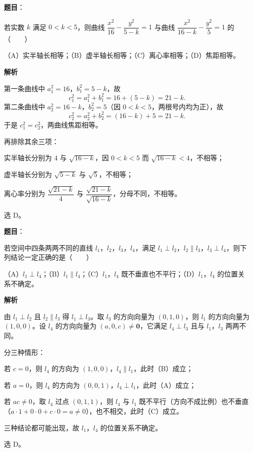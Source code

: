 \begin{answer}

\textbf{题目}：

若实数 $k$ 满足 $0<k<5$，则曲线 $\dfrac{x^2}{16}-\dfrac{y^2}{5-k}=1$ 与曲线 $\dfrac{x^2}{16-k}-\dfrac{y^2}{5}=1$ 的\mbox{（　　）}

（A）实半轴长相等；（B）虚半轴长相等；（C）离心率相等；（D）焦距相等。

\textbf{解析}

第一条曲线中 $a_1^2=16$，$b_1^2=5-k$，故
\nopagebreak[4]
\[c_1^2=a_1^2+b_1^2=16+(5-k)=21-k .\]
第二条曲线中 $a_2^2=16-k$，$b_2^2=5$（因 $0<k<5$，两根号内均为正），故
\nopagebreak[4]
\[c_2^2=a_2^2+b_2^2=(16-k)+5=21-k .\]
于是 $c_1^2=c_2^2$，两曲线焦距相等。

再排除其余三项：

实半轴长分别为 $4$ 与 $\sqrt{16-k}$，因 $0<k<5$ 而 $\sqrt{16-k}<4$，不相等；

虚半轴长分别为 $\sqrt{5-k}$ 与 $\sqrt5$，不相等；

离心率分别为 $\dfrac{\sqrt{21-k}}{4}$ 与 $\dfrac{\sqrt{21-k}}{\sqrt{16-k}}$，分母不同，不相等。

选 D。


\end{answer}
\begin{answer}

\textbf{题目}：

若空间中四条两两不同的直线 $l_1$，$l_2$，$l_3$，$l_4$，满足 $l_1\perp l_2$，$l_2\parallel l_3$，$l_3\perp l_4$，则下列结论一定正确的是\mbox{（　　）}

（A）$l_1\perp l_4$；（B）$l_1\parallel l_4$；（C）$l_1$，$l_4$ 既不垂直也不平行；（D）$l_1$，$l_4$ 的位置关系不确定。

\textbf{解析}

由 $l_1\perp l_2$ 且 $l_2\parallel l_3$ 得 $l_1\perp l_3$。取 $l_3$ 的方向向量为 $(0,1,0)$，则 $l_1$ 的方向向量为 $(1,0,0)$。设 $l_4$ 的方向向量为 $(a,0,c)\neq\boldsymbol 0$，它满足 $l_4\perp l_3$ 且与 $l_1$，$l_3$ 两两不同。

分三种情形：

若 $c=0$，则 $l_4$ 的方向为 $(1,0,0)$，$l_4\parallel l_1$，此时（B）成立；

若 $a=0$，则 $l_4$ 的方向为 $(0,0,1)$，$l_4\perp l_1$，此时（A）成立；

若 $ac\neq0$，取 $l_4$ 过点 $(0,1,1)$，则 $l_4$ 与 $l_1$ 既不平行（方向不成比例）也不垂直（$a\cdot1+0\cdot0+c\cdot0=a\neq0$），也不相交，此时（C）成立。

三种结论都可能出现，故 $l_1$，$l_4$ 的位置关系不确定。

选 D。


\end{answer}

